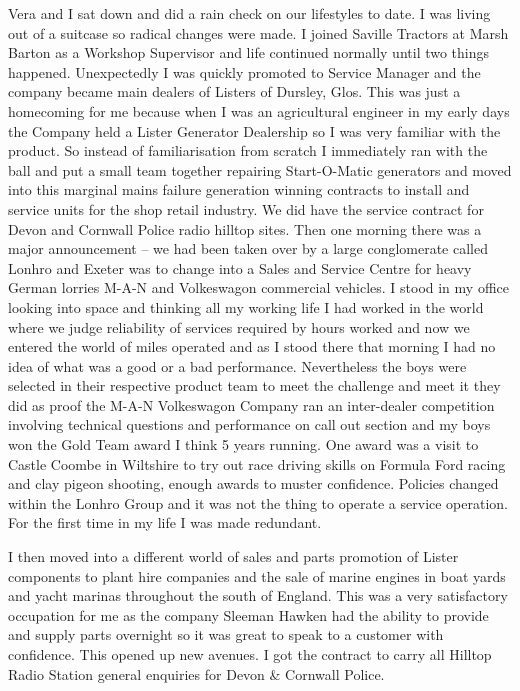 
Vera and I sat down and did a rain check on our lifestyles to date. I was living
out of a suitcase so radical changes were made. I joined Saville Tractors at
Marsh Barton as a Workshop Supervisor and life continued normally until two
things happened. Unexpectedly I was quickly promoted to Service Manager and the
company became main dealers of Listers of Dursley, Glos. This was just a
homecoming for me because when I was an agricultural engineer in my early days
the Company held a Lister Generator Dealership so I was very familiar with the
product. So instead of familiarisation from scratch I immediately ran with the
ball and put a small team together repairing Start-O-Matic generators and moved
into this marginal mains failure generation winning contracts to install and
service units for the shop retail industry. We did have the service contract
for Devon and Cornwall Police radio hilltop sites. Then one morning there was a
major announcement – we had been taken over by a large conglomerate called
Lonhro and Exeter was to change into a Sales and Service Centre for heavy
German lorries M-A-N and Volkeswagon commercial vehicles. I stood in my office
looking into space and thinking all my working life I had worked in the world
where we judge reliability of services required by hours worked and now we
entered the world of miles operated and as I stood there that morning I had no
idea of what was a good or a bad performance. Nevertheless the boys were
selected in their respective product team to meet the challenge and meet it
they did as proof the M-A-N Volkeswagon Company ran an inter-dealer competition
involving technical questions and performance on call out section and my boys
won the Gold Team award I think 5 years running. One award was a visit to
Castle Coombe in Wiltshire to try out race driving skills on Formula Ford
racing and clay pigeon shooting, enough awards to muster confidence. Policies
changed within the Lonhro Group and it was not the thing to operate a service
operation. For the first time in my life I was made redundant.

I then moved into a different world of sales and parts promotion of Lister
components to plant hire companies and the sale of marine engines in boat yards
and yacht marinas throughout the south of England. This was a very satisfactory
occupation for me as the company Sleeman Hawken had the ability to provide and
supply parts overnight so it was great to speak to a customer with confidence.
This opened up new avenues. I got the contract to carry all Hilltop Radio
Station general enquiries for Devon \& Cornwall Police.

